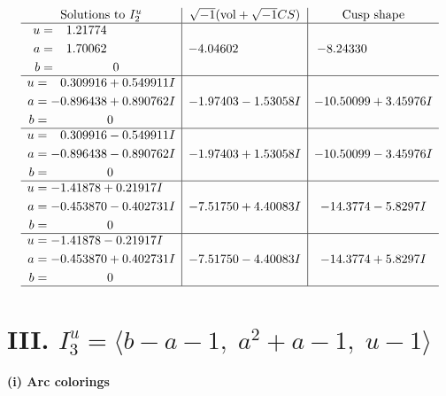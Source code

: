 \documentclass[1p]{elsarticle_modified}
\theoremstyle{definition}
\newcommand{\I}{\sqrt{-1}}
\begin{document}
$$\begin{array}{c|c|c}  
\text{Solutions to }I^u_{2}& \I (\text{vol} + \sqrt{-1}CS) & \text{Cusp shape}\\
 \hline 
\begin{aligned}
u &= \phantom{-}1.21774\phantom{ +0.000000I} \\
a &= \phantom{-}1.70062\phantom{ +0.000000I} \\
b &= \phantom{-0.000000 } 0\end{aligned}
 & -4.04602\phantom{ +0.000000I} & -8.24330\phantom{ +0.000000I} \\ \hline\begin{aligned}
u &= \phantom{-}0.309916 + 0.549911 I \\
a &= -0.896438 + 0.890762 I \\
b &= \phantom{-0.000000 } 0\end{aligned}
 & -1.97403 - 1.53058 I & -10.50099 + 3.45976 I \\ \hline\begin{aligned}
u &= \phantom{-}0.309916 - 0.549911 I \\
a &= -0.896438 - 0.890762 I \\
b &= \phantom{-0.000000 } 0\end{aligned}
 & -1.97403 + 1.53058 I & -10.50099 - 3.45976 I \\ \hline\begin{aligned}
u &= -1.41878 + 0.21917 I \\
a &= -0.453870 - 0.402731 I \\
b &= \phantom{-0.000000 } 0\end{aligned}
 & -7.51750 + 4.40083 I & -14.3774 - 5.8297 I \\ \hline\begin{aligned}
u &= -1.41878 - 0.21917 I \\
a &= -0.453870 + 0.402731 I \\
b &= \phantom{-0.000000 } 0\end{aligned}
 & -7.51750 - 4.40083 I & -14.3774 + 5.8297 I\\
 \hline 
 \end{array}$$\newpage\newpage\renewcommand{\arraystretch}{1}
\centering \section*{III. $I^u_{3}= \langle b- a-1,\;a^2+a-1,\;u-1 \rangle$}
\flushleft \textbf{(i) Arc colorings}\\
\end{document}
